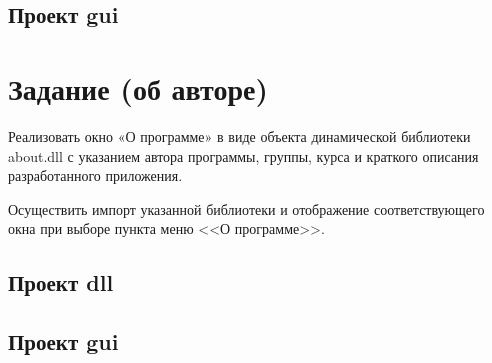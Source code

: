 





\subsection{Проект gui}






\section{Задание (об авторе)}

Реализовать окно «О программе» в виде объекта динамической библиотеки about.dll
с указанием автора программы, группы, курса и краткого описания разработанного приложения.

Осуществить импорт указанной библиотеки и отображение соответствующего окна при выборе пункта меню <<О программе>>.

\subsection{Проект dll}









\newpage

\subsection{Проект gui}



